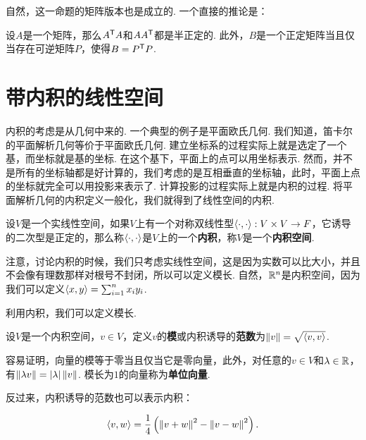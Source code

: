 自然，这一命题的矩阵版本也是成立的. 一个直接的推论是：

\begin{corollary}\label{cor:positive-definite}
设$A$是一个矩阵，那么$A^{\mathsf{T}} A$和$AA^{\mathsf{T}}$都是半正定的. 此外，$B$是一个正定矩阵当且仅当存在可逆矩阵$P$，使得$B=P^{\mathsf{T}} P$.
\end{corollary}

\section{带内积的线性空间}\label{sec:inner-product}

内积的考虑是从几何中来的. 一个典型的例子是平面欧氏几何. 我们知道，笛卡尔的平面解析几何等价于平面欧氏几何. 建立坐标系的过程实际上就是选定了一个基，而坐标就是基的坐标. 在这个基下，平面上的点可以用坐标表示. 然而，并不是所有的坐标轴都是好计算的，我们考虑的是互相垂直的坐标轴，此时，平面上点的坐标就完全可以用投影来表示了. 计算投影的过程实际上就是内积的过程. 将平面解析几何的内积定义一般化，我们就得到了线性空间的内积. 


\begin{definition}[内积]
设$V$是一个实线性空间，如果$V$上有一个对称双线性型$\left\langle{\cdot},{\cdot}\right\rangle:V\times V\to F$，它诱导的二次型是正定的，那么称$\left\langle{\cdot},{\cdot}\right\rangle$是$V$上的一个\textbf{内积}，称$V$是一个\textbf{内积空间}. 
\end{definition}

注意，讨论内积的时候，我们只考虑实线性空间，这是因为实数可以比大小，并且不会像有理数那样对根号不封闭，所以可以定义模长. 自然，$\mathbb{R}^n$是内积空间，因为我们可以定义$\left\langle{x},{y}\right\rangle=\sum_{i=1}^n x_iy_i$. 

利用内积，我们可以定义模长. 

\begin{definition}[模]
设$V$是一个内积空间，$v\in V$，定义$v$的\textbf{模}或内积诱导的\textbf{范数}为$\left\|v\right\|=\sqrt{\left\langle{v},{v}\right\rangle}$.
\end{definition}

容易证明，向量的模等于零当且仅当它是零向量，此外，对任意的$v\in V$和$\lambda\in\mathbb{R}$，有$\left\|\lambda v\right\|=|\lambda|\left\|v\right\|$. 模长为$1$的向量称为\textbf{单位向量}.

反过来，内积诱导的范数也可以表示内积：

\begin{equation}
    \left\langle{v},{w}\right\rangle=\frac{1}{4}\left(\left\|v+w\right\|^2-\left\|v-w\right\|^2\right).\label{eq:inner}
\end{equation}

